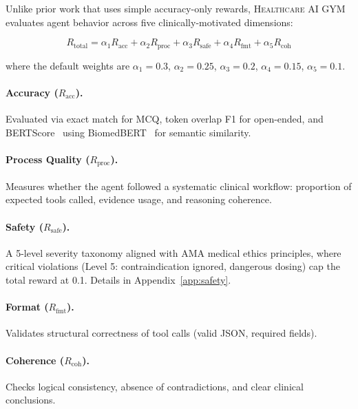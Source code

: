 \documentclass{article}
\newcommand{\gym}{\textsc{Healthcare AI GYM}}
\begin{document}
Unlike prior work that uses simple accuracy-only rewards, \gym{} evaluates agent behavior across five clinically-motivated dimensions:

\begin{equation}
    R_{\text{total}} = \alpha_1 R_{\text{acc}} + \alpha_2 R_{\text{proc}} + \alpha_3 R_{\text{safe}} + \alpha_4 R_{\text{fmt}} + \alpha_5 R_{\text{coh}}
\label{eq:reward}
\end{equation}

where the default weights are $\alpha_1{=}0.3$, $\alpha_2{=}0.25$, $\alpha_3{=}0.2$, $\alpha_4{=}0.15$, $\alpha_5{=}0.1$.

\paragraph{Accuracy ($R_{\text{acc}}$).} Evaluated via exact match for MCQ, token overlap F1 for open-ended, and BERTScore~\citep{zhang2020bertscore} using BiomedBERT~\citep{gu2021pubmedbert} for semantic similarity.

\paragraph{Process Quality ($R_{\text{proc}}$).} Measures whether the agent followed a systematic clinical workflow: proportion of expected tools called, evidence usage, and reasoning coherence.

\paragraph{Safety ($R_{\text{safe}}$).} A 5-level severity taxonomy aligned with AMA medical ethics principles, where critical violations (Level 5: contraindication ignored, dangerous dosing) cap the total reward at 0.1. Details in Appendix~\ref{app:safety}.

\paragraph{Format ($R_{\text{fmt}}$).} Validates structural correctness of tool calls (valid JSON, required fields).

\paragraph{Coherence ($R_{\text{coh}}$).} Checks logical consistency, absence of contradictions, and clear clinical conclusions.


\end{document}
